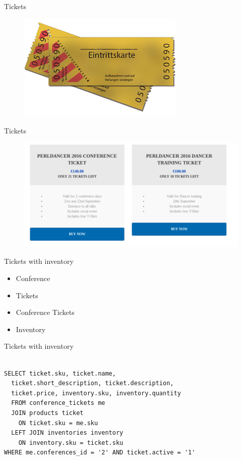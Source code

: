 \begin{frame}{Tickets}
\begin{figure}[!ht]
\centering
\includegraphics[width=0.8\linewidth]{img/cinema-ticket.png}
\end{figure}
\end{frame}

\begin{frame}{Tickets}
\begin{figure}[!ht]
\centering
\includegraphics[width=0.8\linewidth]{img/ticket-view.png}
\end{figure}
\end{frame}

\begin{frame}[fragile]{Tickets with inventory}
\begin{itemize}
\item Conference
\item Tickets
\item Conference Tickets
\item Inventory
\end{itemize}
\end{frame}

\begin{frame}[fragile]{Tickets with inventory}
\begin{lstlisting}

SELECT ticket.sku, ticket.name, 
  ticket.short_description, ticket.description, 
  ticket.price, inventory.sku, inventory.quantity 
  FROM conference_tickets me 
  JOIN products ticket 
    ON ticket.sku = me.sku 
  LEFT JOIN inventories inventory 
    ON inventory.sku = ticket.sku 
WHERE me.conferences_id = '2' AND ticket.active = '1'

\end{lstlisting}
\end{frame}

